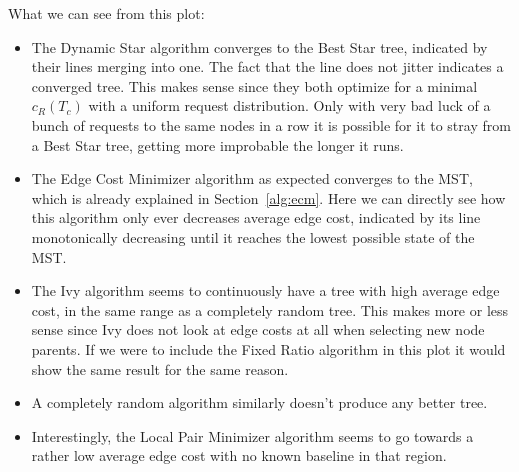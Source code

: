 \documentclass[a4paper, oneside]{discothesis}
\begin{document}

What we can see from this plot:
\begin{itemize}
\item The Dynamic Star algorithm converges to the Best Star tree, indicated by their lines merging into one. The fact that the line does not jitter indicates a converged tree. This makes sense since they both optimize for a minimal $c_R(T_c)$ with a uniform request distribution. Only with very bad luck of a bunch of requests to the same nodes in a row it is possible for it to stray from a Best Star tree, getting more improbable the longer it runs.
\item The Edge Cost Minimizer algorithm as expected converges to the MST, which is already explained in Section~\ref{alg:ecm}. Here we can directly see how this algorithm only ever decreases average edge cost, indicated by its line monotonically decreasing until it reaches the lowest possible state of the MST.
\item The Ivy algorithm seems to continuously have a tree with high average edge cost, in the same range as a completely random tree. This makes more or less sense since Ivy does not look at edge costs at all when selecting new node parents. If we were to include the Fixed Ratio algorithm in this plot it would show the same result for the same reason.
\item A completely random algorithm similarly doesn't produce any better tree.
\item Interestingly, the Local Pair Minimizer algorithm seems to go towards a rather low average edge cost with no known baseline in that region.
\end{itemize}
\end{document}
